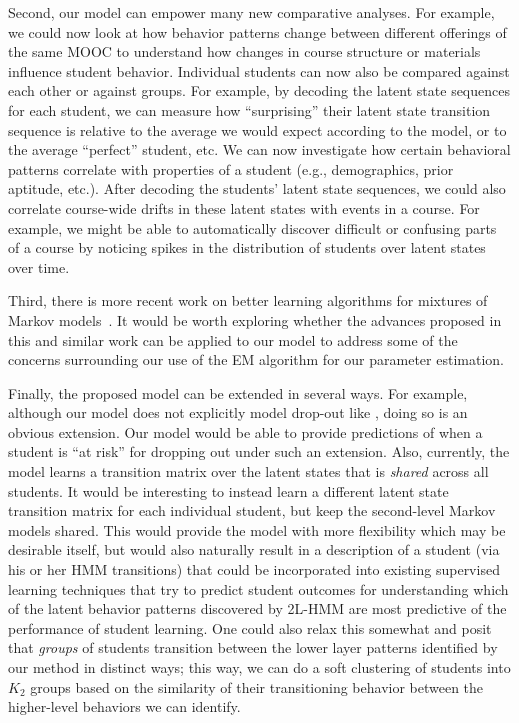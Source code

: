 Second, our model can empower many new comparative analyses. For example, we could
now look at how behavior patterns change between different offerings of
the same MOOC to understand how changes in course structure or materials
influence student behavior. Individual students can now also be compared
against each other or against groups. For example, by decoding the latent
state sequences for each student, we can measure how ``surprising'' their
latent state transition sequence is relative to the average we would expect
according to the model, or to the average ``perfect'' student, etc. We can
now investigate how certain behavioral patterns correlate with properties
of a student (e.g., demographics, prior aptitude, etc.). After decoding the
students' latent state sequences, we could also correlate course-wide
drifts in these latent states with events in a course. For example, we
might be able to automatically discover difficult or confusing parts of a
course by noticing spikes in the distribution of students over latent
states over time.

Third, there is more recent work on better learning algorithms for mixtures of
Markov models~\citep{Gupta:2016:NIPS}. It would be worth exploring whether
the advances proposed in this and similar work can be applied to our model
to address some of the concerns surrounding our use of the EM algorithm for
our parameter estimation.

Finally, the proposed model can be extended in several ways. For example, 
although our model does not explicitly model drop-out like
\citet{Kizilcec:2013:LAK}, doing so is an obvious extension. Our model
would be able to provide predictions of when a student is ``at risk'' for
dropping out under such an extension.
Also, currently, the model learns a transition matrix over the latent states that
is \emph{shared} across all students. It would be interesting to instead
learn a different latent state transition matrix for each individual
student, but keep the second-level Markov models shared. This would provide
the model with more flexibility which may be desirable itself, but would
also naturally result in a description of a student (via his or her HMM
transitions) that could be incorporated into existing supervised learning
techniques that try to predict student outcomes for understanding
which of the latent behavior patterns discovered by 2L-HMM are most predictive
of the performance of student learning. One could also relax this somewhat
and posit that \emph{groups} of students transition between the lower layer
patterns identified by our method in distinct ways; this way, we can do a soft
clustering of students into $K_2$ groups based on the similarity of their
transitioning behavior between the higher-level behaviors we can identify.


